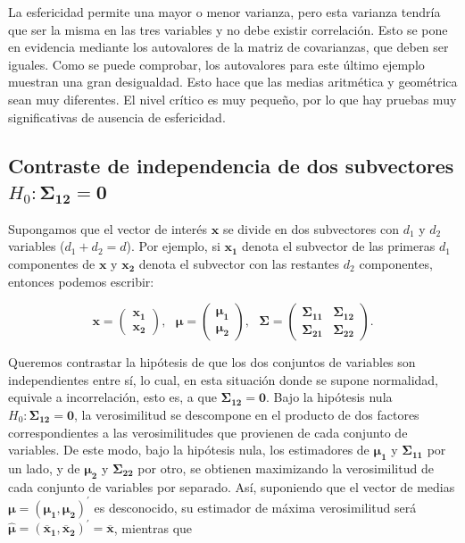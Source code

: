 \documentclass[
  a4paper,
  oneside]{scrbook}
\theoremstyle{definition}
\theoremstyle{definition}
\theoremstyle{definition}
\theoremstyle{definition}
\theoremstyle{remark}
\begin{document}
\normalsize

La esfericidad permite una mayor o menor varianza, pero esta varianza
tendría que ser la misma en las tres variables y no debe existir
correlación. Esto se pone en evidencia mediante los autovalores de la
matriz de covarianzas, que deben ser iguales. Como se puede comprobar,
los autovalores para este último ejemplo muestran una gran desigualdad.
Esto hace que las medias aritmética y geométrica sean muy diferentes. El
nivel crítico es muy pequeño, por lo que hay
pruebas muy significativas de ausencia de esfericidad.

\subsection{\texorpdfstring{Contraste de independencia de dos subvectores \(H_0: \bm{\Sigma_{12}}=\bm{0}\)}{Contraste de independencia de dos subvectores H\_0: \textbackslash bm\{\textbackslash Sigma\_\{12\}\}=\textbackslash bm\{0\}}}\label{contraste-de-independencia-de-dos-subvectores-h-0-bm-sigma-12-bm-0}

Supongamos que el vector de interés \(\bm{x}\) se divide en dos
subvectores con \(d_1\) y \(d_2\) variables (\(d_1+d_2=d\)). Por ejemplo, si
\(\bm{x_1}\) denota el subvector de las primeras \(d_1\) componentes de
\(\bm{x}\) y \(\bm{x_2}\) denota el subvector con las restantes \(d_2\)
componentes, entonces podemos escribir:

\[\bm{x}=\left(
\begin{array}{c}
\bm{x_1}\\ 
\bm{x_2}
\end{array}
\right),\ \ \ \bm{\mu}=\left(\begin{array}{c}\bm{\mu_1}\\ \bm{\mu_2}\end{array}\right),\ \ \ \bm{\Sigma}=\left(\begin{array}{cc}\bm{\Sigma_{11}}&\bm{\Sigma_{12}}\\ \bm{\Sigma_{21}}&\bm{\Sigma_{22}}\end{array}\right).\]

Queremos contrastar la hipótesis de que los dos conjuntos de variables
son independientes entre sí, lo cual, en esta situación donde se supone
normalidad, equivale a incorrelación, esto es, a que
\(\bm{\Sigma_{12}}=\bm{0}\). Bajo la hipótesis nula
\(H_0: \bm{\Sigma_{12}}=\bm{0}\), la verosimilitud se descompone en el
producto de dos factores correspondientes a las verosimilitudes que
provienen de cada conjunto de variables. De este modo, bajo la hipótesis
nula, los estimadores de \(\bm{\mu_1}\) y \(\bm{\Sigma_{11}}\) por un lado,
y de \(\bm{\mu_2}\) y \(\bm{\Sigma_{22}}\) por otro, se obtienen maximizando
la verosimilitud de cada conjunto de variables por separado. Así,
suponiendo que el vector de medias
\(\bm{\mu}=(\bm{\mu_1},\bm{\mu_2})^\prime{}\) es desconocido, su estimador
de máxima verosimilitud será
\(\hat{\bm{\mu}}=(\bm{\overline{x}_1},\bm{\overline{x}_2})^\prime{}=\overline{\bm{x}}\),
mientras que
\end{document}

